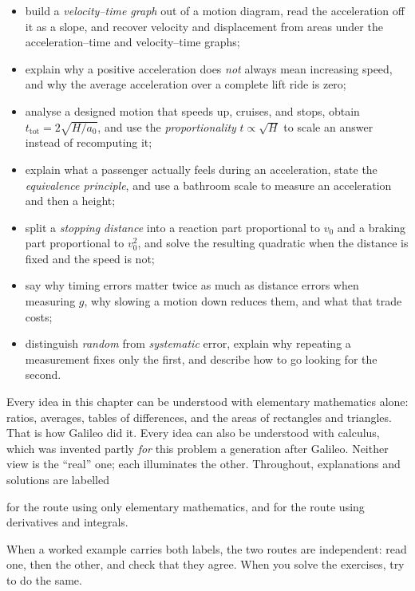 \documentclass[11pt,twoside,openany]{book}
\newcounter{check}[chapter]
\newcommand{\viewtag}[3]{\fcolorbox{#2}{#3}{\footnotesize\textbf{\textcolor{#2}{#1}}}}
\newcommand{\elemtag}{\viewtag{Elementary}{elemcol}{elempale}}
\newcommand{\calctag}{\viewtag{Calculus}{calccol}{calcpale}}
\begin{document}
\begin{tcolorbox}[enhanced,breakable,colback=white,colframe=teal,sharp corners,boxrule=1pt,
  title=\textbf{In this chapter},coltitle=white,colbacktitle=teal,left=3mm,right=3mm]
\begin{itemize}[itemsep=2pt,topsep=2pt]
  \item build a \emph{velocity--time graph} out of a motion diagram, read the acceleration off it as a slope, and recover velocity and displacement from areas under the acceleration--time and velocity--time graphs;
  \item explain why a positive acceleration does \emph{not} always mean increasing speed, and why the average acceleration over a complete lift ride is zero;
  \item analyse a designed motion that speeds up, cruises, and stops, obtain $t_{\text{tot}} = 2\sqrt{H/a_0}$, and use the \emph{proportionality} $t \propto \sqrt{H}$ to scale an answer instead of recomputing it;
  \item explain what a passenger actually feels during an acceleration, state the \emph{equivalence principle}, and use a bathroom scale to measure an acceleration and then a height;
  \item split a \emph{stopping distance} into a reaction part proportional to $v_0$ and a braking part proportional to $v_0^2$, and solve the resulting quadratic when the distance is fixed and the speed is not;
  \item say why timing errors matter twice as much as distance errors when measuring $g$, why slowing a motion down reduces them, and what that trade costs;
  \item distinguish \emph{random} from \emph{systematic} error, explain why repeating a measurement fixes only the first, and describe how to go looking for the second.
\end{itemize}
\end{tcolorbox}

\begin{tcolorbox}[enhanced,colback=slatepale,colframe=slate,sharp corners,boxrule=0.6pt,
  title=\textbf{How to read this chapter: two perspectives},coltitle=white,colbacktitle=slate,left=3mm,right=3mm]
Every idea in this chapter can be understood with elementary mathematics alone: ratios, averages, tables of differences, and the areas of rectangles and triangles. That is how Galileo did it. Every idea can also be understood with calculus, which was invented partly \emph{for} this problem a generation after Galileo. Neither view is the ``real'' one; each illuminates the other. Throughout, explanations and solutions are labelled
\begin{center}
\elemtag\quad for the route using only elementary mathematics, and \qquad \calctag\quad for the route using derivatives and integrals.
\end{center}
When a worked example carries both labels, the two routes are independent: read one, then the other, and check that they agree. When you solve the exercises, try to do the same.
\end{tcolorbox}
\end{document}
